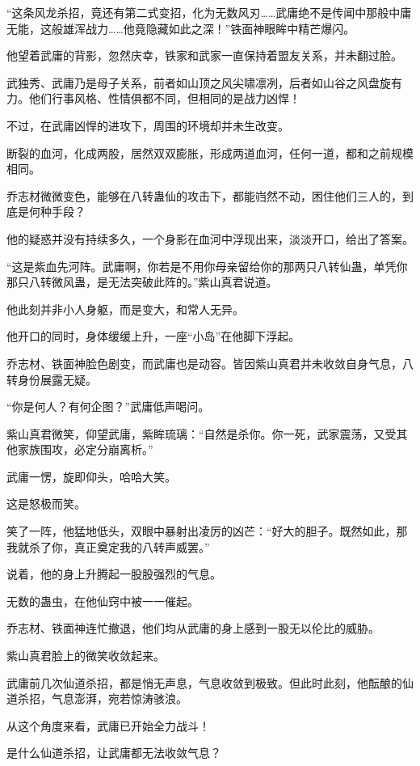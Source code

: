 \begin{this_body}
“这条风龙杀招，竟还有第二式变招，化为无数风刃……武庸绝不是传闻中那般中庸无能，这般雄浑战力……他竟隐藏如此之深！”铁面神眼眸中精芒爆闪。

他望着武庸的背影，忽然庆幸，铁家和武家一直保持着盟友关系，并未翻过脸。

武独秀、武庸乃是母子关系，前者如山顶之风尖啸凛冽，后者如山谷之风盘旋有力。他们行事风格、性情俱都不同，但相同的是战力凶悍！

不过，在武庸凶悍的进攻下，周围的环境却并未生改变。

断裂的血河，化成两股，居然双双膨胀，形成两道血河，任何一道，都和之前规模相同。

乔志材微微变色，能够在八转蛊仙的攻击下，都能岿然不动，困住他们三人的，到底是何种手段？

他的疑惑并没有持续多久，一个身影在血河中浮现出来，淡淡开口，给出了答案。

“这是紫血先河阵。武庸啊，你若是不用你母亲留给你的那两只八转仙蛊，单凭你那只八转微风蛊，是无法突破此阵的。”紫山真君说道。

他此刻并非小人身躯，而是变大，和常人无异。

他开口的同时，身体缓缓上升，一座“小岛”在他脚下浮起。

乔志材、铁面神脸色剧变，而武庸也是动容。皆因紫山真君并未收敛自身气息，八转身份展露无疑。

“你是何人？有何企图？”武庸低声喝问。

紫山真君微笑，仰望武庸，紫眸琉璃：“自然是杀你。你一死，武家震荡，又受其他家族围攻，必定分崩离析。”

武庸一愣，旋即仰头，哈哈大笑。

这是怒极而笑。

笑了一阵，他猛地低头，双眼中暴射出凌厉的凶芒：“好大的胆子。既然如此，那我就杀了你，真正奠定我的八转声威罢。”

说着，他的身上升腾起一股股强烈的气息。

无数的蛊虫，在他仙窍中被一一催起。

乔志材、铁面神连忙撤退，他们均从武庸的身上感到一股无以伦比的威胁。

紫山真君脸上的微笑收敛起来。

武庸前几次仙道杀招，都是悄无声息，气息收敛到极致。但此时此刻，他酝酿的仙道杀招，气息澎湃，宛若惊涛骇浪。

从这个角度来看，武庸已开始全力战斗！

是什么仙道杀招，让武庸都无法收敛气息？


\end{this_body}
